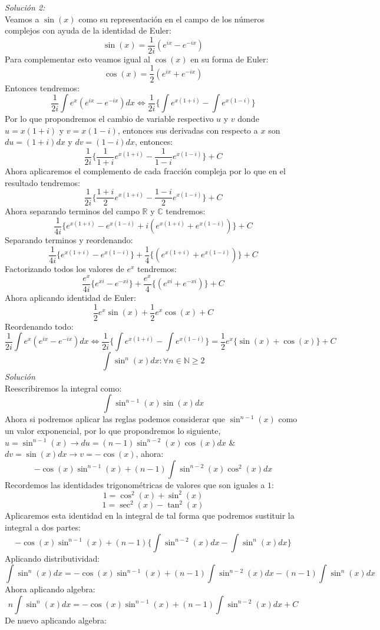 \documentclass[10pt,executivepaper]{article}
\begin{document}
\textit{Solución 2:}\\
Veamos a $\sin(x)$ como su representación en el campo de los números complejos con ayuda de la identidad de Euler:
\[\sin(x)= \frac{1}{2i}(e^{ix}-e^{-ix})\]
Para complementar esto veamos igual al $\cos(x)$ en su forma de Euler:
\[\cos(x)= \frac{1}{2}(e^{ix}+e^{-ix})\]
Entonces tendremos:
\[\frac{1}{2i}\int e^{x}(e^{ix}-e^{-ix})dx \Leftrightarrow \frac{1}{2i}\{\int e^{x(1+i)} - \int e^{x(1-i)}\}\]
Por lo que propondremos el cambio de variable respectivo $u$ y $v$ donde $u=x(1+i)$ y $v=x(1-i)$, entonces sus derivadas con respecto a $x$ son $du=(1+i)dx$ y $dv=(1-i)dx$, entonces:
\[\frac{1}{2i}\{\frac{1}{1+i}e^{x(1+i)}-\frac{1}{1-i}e^{x(1-i)}\}+C\]
Ahora aplicaremos el complemento de cada fracción compleja por lo que en el resultado tendremos:
\[\frac{1}{2i}\{\frac{1+i}{2}e^{x(1+i)}-\frac{1-i}{2}e^{x(1-i)}\}+C\]
Ahora separando terminos del campo $\mathbb{R}$ y $\mathbb{C}$ tendremos:
\[\frac{1}{4i}\{e^{x(1+i)}-e^{x(1-i)} + i(e^{x(1+i)}+e^{x(1-i)})\}+C\]
Separando terminos y reordenando:
\[\frac{1}{4i}\{e^{x(1+i)}-e^{x(1-i)}\} + \frac{1}{4}\{(e^{x(1+i)}+e^{x(1-i)})\}+C\]
Factorizando todos los valores de $e^{x}$ tendremos:
\[\frac{e^{x}}{4i}\{e^{xi}-e^{-xi}\} + \frac{e^{x}}{4}\{(e^{xi}+e^{-xi})\}+C\]
Ahora aplicando identidad de Euler:
\[\frac{1}{2}e^{x}\sin(x) + \frac{1}{2}e^{x}\cos(x)+C\]
Reordenando todo:
\[\frac{1}{2i}\int e^{x}(e^{ix}-e^{-ix})dx \Leftrightarrow \frac{1}{2i}\{\int e^{x(1+i)} - \int e^{x(1-i)}\} = \frac{1}{2}e^x\{\sin(x)+\cos(x)\}+C\]
\clearpage
\[\int \sin^{n}(x)dx \colon \forall n\in\mathbb{N}\geq 2\]
\textit{Solución}\\
Reescribiremos la integral como:
\[\int \sin^{n-1}(x)\sin(x)dx\]
Ahora si podremos aplicar las reglas podemos considerar que $\sin^{n-1}(x)$ como un valor exponencial, por lo que propondremos lo siguiente, $u=\sin^{n-1}(x) \rightarrow du=(n-1)\sin^{n-2}(x)\cos(x)dx$ \& $dv = \sin(x)dx \rightarrow v=-\cos(x)$, ahora:
\[-\cos(x)\sin^{n-1}(x) + (n-1)\int \sin^{n-2}(x)\cos^{2}(x)dx\]
Recordemos las identidades trigonométricas de valores que son iguales a $1$:
\[1=\cos^2(x)+\sin^{2}(x)\]
\[1=\sec^{2}(x)-\tan^{2}(x)\]
Aplicaremos esta identidad en la integral de tal forma que podremos sustituir la integral a dos partes:
\[-\cos(x)\sin^{n-1}(x) + (n-1)\{\int \sin^{n-2}(x)dx -\int\sin^{n}(x)dx\}\]
Aplicando distributividad:
\[\int\sin^{n}(x)dx=-\cos(x)\sin^{n-1}(x) + (n-1)\int \sin^{n-2}(x)dx -(n-1)\int\sin^{n}(x)dx\]
Ahora aplicando algebra:
\[n\int\sin^{n}(x)dx=-\cos(x)\sin^{n-1}(x) + (n-1)\int \sin^{n-2}(x)dx + C\]
De nuevo aplicando algebra:
\end{document}
